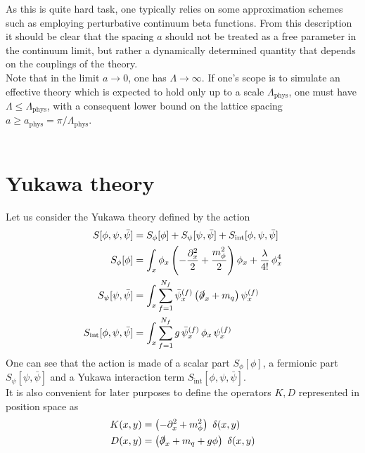 As this is quite hard task, one typically relies on some approximation schemes such as employing perturbative continuum beta functions. From this description it should be clear that the spacing $a$ should not be treated as a free parameter in the continuum limit, but rather a dynamically determined quantity that depends on the couplings of the theory. \\
Note that in the limit $a \to 0$, one has $\Lambda \to \infty$. If one's scope is to simulate an effective theory which is expected to hold only up to a scale $\Lambda_\text{phys}$, one must have $\Lambda \leq \Lambda_\text{phys}$, with a consequent lower bound on the lattice spacing $a \geq a_\text{phys} = \pi / \Lambda_\text{phys}$. \\ ~

\section{Yukawa theory}
\label{sec:Yukawa_theory}
Let us consider the Yukawa theory defined by the action
\begin{equation}
\begin{aligned}
    S[\phi,\psi,\bar\psi] &= S_\phi[\phi] + S_\psi[\psi, \bar\psi] + S_\text{int}[\phi, \psi, \bar\psi]\\
     S_\phi[\phi] &= \int_x \phi_x \left(-\frac{\partial^2_x}{2} + \frac{m_\phi^2}{2}\right) \phi_x + \frac{\lambda}{4!} \, \phi_x^4 \\
     S_\psi[\psi, \bar\psi] &= \int_x \sum_{f=1}^{N_f} \bar \psi_x^{(f)} \left(\slashed{\partial}_x + m_q \right) \psi_x^{(f)} \\
     S_\text{int}[\phi, \psi, \bar\psi] &= \int_x \sum_{f=1}^{N_f} g \, \bar \psi_x^{(f)} \, \phi_x \, \psi_x^{(f)}
    \label{eq:full_action_continuum}
\end{aligned}
\end{equation}
One can see that the action is made of a scalar part $S_\phi[\phi]$, a fermionic part $S_\psi[\psi, \bar\psi]$ and a Yukawa interaction term $S_\text{int}[\phi, \psi, \bar\psi]$. \\
It is also convenient for later purposes to define the operators $K, D$ represented in position space as 
\begin{equation}
    \begin{aligned}
        K(x, y) &=  \left(-\partial^2_x + m_\phi^2\right) \ \delta(x,y) \\
        D(x, y) &= \left(\slashed{\partial}_x + m_q + g\phi \right) \ \delta(x,y)
    \end{aligned}
    \label{eq:definition_kinetic_terms_continuum_position}
\end{equation}
